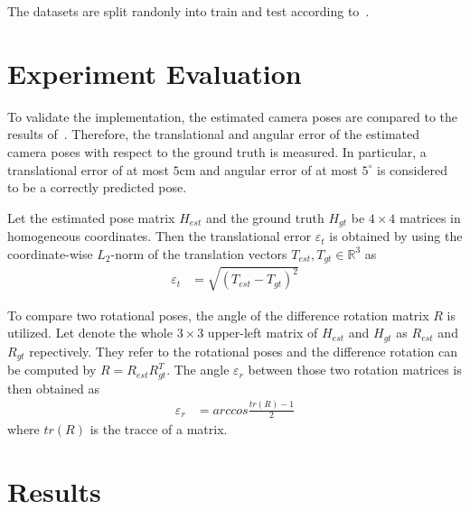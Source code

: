 \documentclass[final]{cvpr}
\begin{document}
The datasets are split randonly into train and test according to~\cite[Table 1]{shotton2013}. 

\section{Experiment Evaluation}
To validate the implementation, the estimated camera poses are compared to the results 
of~\cite{shotton2013}. Therefore, the translational and angular error of the estimated camera 
poses with respect to the ground truth is measured. In particular, a translational error of at 
most $5$cm and angular error of at most $5^{\circ}$ is considered to be a correctly predicted pose. 

Let the estimated pose matrix $H_{est}$ and the ground truth $H_{gt}$ be $4 \times 4$ matrices
in homogeneous coordinates. Then the translational error $\varepsilon_t$ is obtained by using the 
coordinate-wise $L_2$-norm of the translation vectors $T_{est}, T_{gt} \in \mathbb{R}^3$ as 
\begin{align}
    \varepsilon_t &= \sqrt{(T_{est} - T_{gt})^2}
\end{align}

To compare two rotational poses, the angle of the difference rotation matrix $R$ is utilized. 
Let denote the whole $3\times3$ upper-left matrix of $H_{est}$ and $H_{gt}$ as $R_{est}$ and 
$R_{gt}$ repectively. They refer to the rotational poses and the difference rotation can be computed 
by $R = R_{est}R_{gt}^T$. The angle $\varepsilon_r$ between those two rotation matrices is then obtained as
\begin{align}
    \varepsilon_r &= arccos \frac{tr(R)-1}{2}
\end{align}
where $tr(R)$ is the tracce of a matrix.


\section{Results}


{\small


}
\end{document}
